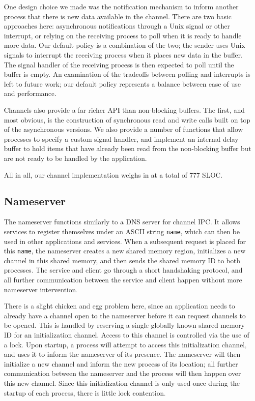 \documentclass[letterpaper,twocolumn,11pt]{article}
\begin{document}
One design choice we made was the notification mechanism to inform another process that there is new data available in the channel. There are two basic approaches here: asynchronous notifications through a Unix signal or other interrupt, or relying on the receiving process to poll when it is ready to handle more data. Our default policy is a combination of the two; the sender uses Unix signals to interrupt the receiving process when it places new data in the buffer. The signal handler of the receiving process is then expected to poll until the buffer is empty. An examination of the tradeoffs between polling and interrupts is left to future work; our default policy represents a balance between ease of use and performance.

Channels also provide a far richer API than non-blocking buffers. The first, and most obvious, is the construction of synchronous read and write calls built on top of the asynchronous versions. We also provide a number of functions that allow processes to specify a custom signal handler, and implement an internal delay buffer to hold items that have already been read from the non-blocking buffer but are not ready to be handled by the application.

All in all, our channel implementation weighs in at a total of 777 SLOC.

\subsection{Nameserver}
The nameserver functions similarly to a DNS server for channel IPC. It allows services to register themselves under an ASCII string {\tt name}, which can then be used in other applications and services. When a subsequent request is placed for this {\tt name}, the nameserver creates a new shared memory region, initializes a new channel in this shared memory, and then sends the shared memory ID to both processes. The service and client go through a short handshaking protocol, and all further communication between the service and client happen without more nameserver intervention.

There is a slight chicken and egg problem here, since an application needs to already have a channel open to the nameserver before it can request channels to be opened. This is handled by reserving a single globally known shared memory ID for an initialization channel. Access to this channel is controlled via the use of a lock. Upon startup, a process will attempt to access this initialization channel, and uses it to inform the nameserver of its presence. The nameserver will then initialize a new channel and inform the new process of its location; all further communication between the nameserver and the process will then happen over this new channel. Since this initialization channel is only used once during the startup of each process, there is little lock contention.
\end{document}
